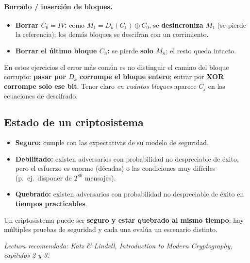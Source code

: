 \documentclass[../main.tex]{subfiles}
\begin{document}
\paragraph{Borrado / inserción de bloques.}
\begin{itemize}[nosep]
  \item \textbf{Borrar $C_0=IV$:} como $M_1 = D_k(C_1)\oplus C_0$, se
        \textbf{desincroniza $M_1$} (se pierde la referencia); los demás
        bloques se descifran con un corrimiento.
  \item \textbf{Borrar el último bloque $C_n$:} se pierde \textbf{solo $M_n$};
        el resto queda intacto.
\end{itemize}

\begin{ojo}
En estos ejercicios el error más común es no distinguir el camino del bloque
corrupto: \textbf{pasar por $D_k$ corrompe el bloque entero}; entrar por
\textbf{XOR corrompe solo ese bit}. Tener claro \emph{en cuántos bloques}
aparece $C_j$ en las ecuaciones de descifrado.
\end{ojo}

\subsection{Estado de un criptosistema}

\begin{itemize}[nosep]
  \item \textbf{Seguro:} cumple con las expectativas de su modelo de seguridad.
  \item \textbf{Debilitado:} existen adversarios con probabilidad no
        despreciable de éxito, pero el esfuerzo es enorme (décadas) o las
        condiciones muy difíciles (p.\ ej.\ disponer de $2^{80}$ mensajes).
  \item \textbf{Quebrado:} existen adversarios con probabilidad no despreciable
        de éxito en \textbf{tiempos practicables}.
\end{itemize}

\begin{destacado}
Un criptosistema puede ser \textbf{seguro y estar quebrado al mismo tiempo}:
hay múltiples pruebas de seguridad y cada una evalúa un escenario distinto.
\end{destacado}


\textit{Lectura recomendada: Katz \& Lindell, \emph{Introduction to Modern
Cryptography}, capítulos 2 y 3.}
\end{document}
